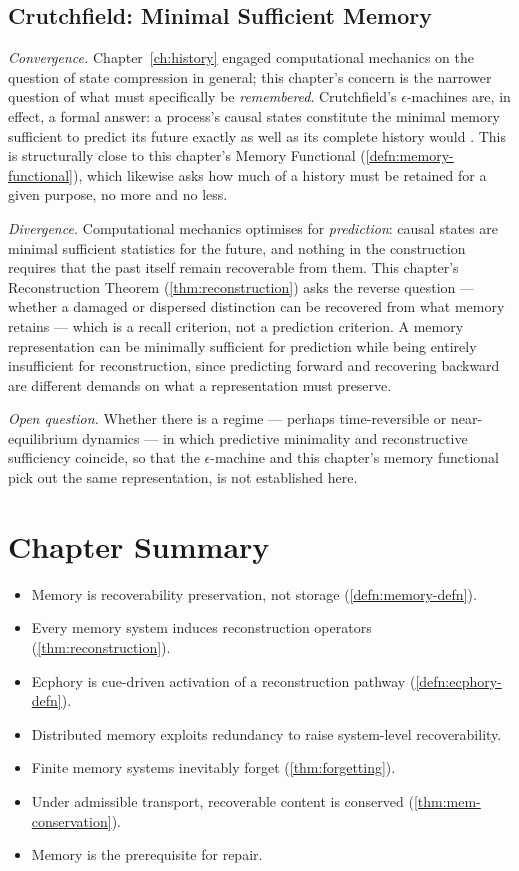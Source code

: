 \documentclass[12pt,twoside,openright]{book}
\newenvironment{chapsummary}{%
  \begin{tcolorbox}[colback=DistBlue!5,colframe=DistBlue,
    title={\faBookOpen\enspace Summary},
    fonttitle=\sffamily\bfseries\color{white},
    attach boxed title to top left={yshift=-2mm,xshift=4mm},
    boxed title style={colback=DistBlue,rounded corners}]
  \begin{itemize}[nosep,leftmargin=*]}{%
  \end{itemize}\end{tcolorbox}}
\begin{document}
\subsection*{Crutchfield: Minimal Sufficient Memory}

\emph{Convergence.} Chapter~\ref{ch:history} engaged
computational mechanics on the question of state compression in
general; this chapter's concern is the narrower question of
what must specifically be \emph{remembered}. Crutchfield's
$\epsilon$-machines are, in effect, a formal answer: a process's
causal states constitute the minimal memory sufficient to
predict its future exactly as well as its complete history would
\parencite{crutchfield2012}. This is structurally close to this
chapter's Memory Functional (\cref{defn:memory-functional}),
which likewise asks how much of a history must be retained for a
given purpose, no more and no less.

\emph{Divergence.} Computational mechanics optimises for
\emph{prediction}: causal states are minimal sufficient
statistics for the future, and nothing in the construction
requires that the past itself remain recoverable from them. This
chapter's Reconstruction Theorem (\cref{thm:reconstruction})
asks the reverse question --- whether a damaged or dispersed
distinction can be recovered from what memory retains --- which
is a recall criterion, not a prediction criterion. A memory
representation can be minimally sufficient for prediction while
being entirely insufficient for reconstruction, since predicting
forward and recovering backward are different demands on what a
representation must preserve.

\emph{Open question.} Whether there is a regime --- perhaps
time-reversible or near-equilibrium dynamics --- in which
predictive minimality and reconstructive sufficiency coincide,
so that the $\epsilon$-machine and this chapter's memory
functional pick out the same representation, is not established
here.

\section*{Chapter Summary}
\begin{chapsummary}
  \item Memory is recoverability preservation, not storage
        (\cref{defn:memory-defn}).
  \item Every memory system induces reconstruction
        operators (\cref{thm:reconstruction}).
  \item Ecphory is cue-driven activation of a
        reconstruction pathway (\cref{defn:ecphory-defn}).
  \item Distributed memory exploits redundancy to raise
        system-level recoverability.
  \item Finite memory systems inevitably forget
        (\cref{thm:forgetting}).
  \item Under admissible transport, recoverable content
        is conserved (\cref{thm:mem-conservation}).
  \item Memory is the prerequisite for repair.
\end{chapsummary}
\end{document}
